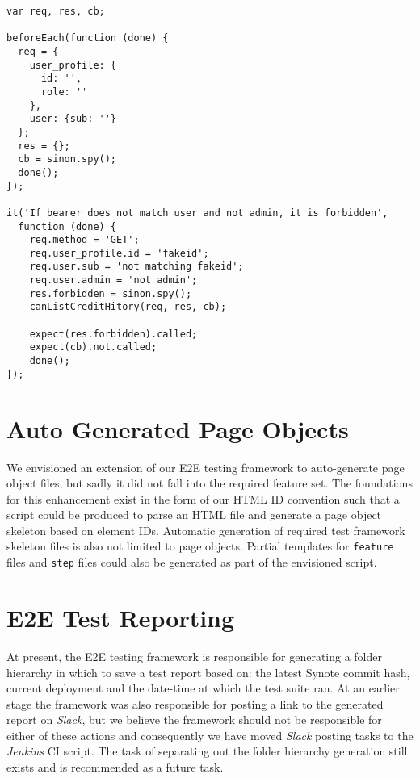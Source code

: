 \begin{listing}[H]
\begin{verbatim}
var req, res, cb;

beforeEach(function (done) {
  req = {
    user_profile: {
      id: '',
      role: ''
    },
    user: {sub: ''}
  };
  res = {};
  cb = sinon.spy();
  done();
});

it('If bearer does not match user and not admin, it is forbidden',
  function (done) {
    req.method = 'GET';
    req.user_profile.id = 'fakeid';
    req.user.sub = 'not matching fakeid';
    req.user.admin = 'not admin';
    res.forbidden = sinon.spy();
    canListCreditHitory(req, res, cb);

    expect(res.forbidden).called;
    expect(cb).not.called;
    done();
});
\end{verbatim}
\label{lst:can-list-credit-test}
\end{listing}

\section{Auto Generated Page Objects}
\label{subsec:auto-generated-page-objects}

We envisioned an extension of our E2E testing framework to auto-generate page object files, but sadly it did not fall into the required feature set. The foundations for this enhancement exist in the form of our HTML ID convention such that a script could be produced to parse an HTML file and generate a page object skeleton based on element IDs. Automatic generation of required test framework skeleton files is also not limited to page objects. Partial templates for \texttt{feature} files and \texttt{step} files could also be generated as part of the envisioned script.

\section{E2E Test Reporting}
\label{subsec:e2e-test-reporting}

At present, the E2E testing framework is responsible for generating a folder hierarchy  in which to save a test report based on: the latest Synote commit hash, current deployment and the date-time at which the test suite ran. At an earlier stage the framework was also responsible for posting a link to the generated report on \textit{Slack}, but we believe the framework should not be responsible for either of these actions and consequently we have moved \textit{Slack} posting tasks to the \textit{Jenkins} CI script. The task of separating out the folder hierarchy generation still exists and is recommended as a future task.

